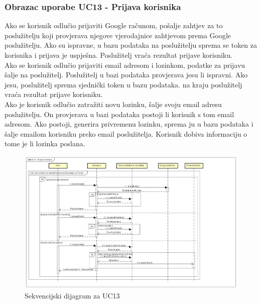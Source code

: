 		
				\subsubsection{Obrazac uporabe UC13 - Prijava korisnika}
				    Ako se korisnik odlučio prijaviti Google računom, pošalje zahtjev za to poslužitelju koji provjerava njegove vjerodajnice zahtjevom prema Google poslužitelju. Ako su ispravne, u bazu podataka na poslužitelju sprema se token za korisnika i prijava je uspješna. Poslužitelj vraća rezultat prijave korisniku. \\
				    Ako se korisnik odlučio prijaviti email adresom i lozinkom, podatke za prijavu šalje na poslužitelj. Poslužitelj u bazi podataka provjerava jesu li ispravni. Ako jesu, poslužitelj sprema sjednički token u bazu podataka. na kraju poslužitelj vraća rezultat prijave korisniku. \\
				    Ako je korisnik odlučio zatražiti novu lozinku, šalje svoju email adresu poslužitelju. On provjerava u bazi podataka postoji li korisnik s tom email adresom. Ako postoji, generira privremenu lozinku, sprema ju u bazu podataka i šalje emailom korisniku preko email poslužitelja. Korisnik dobiva informaciju o tome je li lozinka poslana. \\
	    \begin{figure}[H]
		    \centering
			\includegraphics[width=1.0\linewidth]{dijagrami/sd_uc13.png}
			\caption{Sekvencijski dijagram za UC13}
			\label{fig:sd_uc13}
		\end{figure}
		
		
